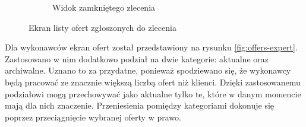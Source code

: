 \begin{figure}[ht!]
\begin{subfigure}[t]{0.32\textwidth}
    \centering
    \caption{Widok zamkniętego zlecenia}
  \end{subfigure}
  \caption{Ekran listy ofert zgłoszonych do zlecenia}
  \label{fig:offers-client}
\end{figure}

Dla wykonawców ekran ofert został przedstawiony na rysunku \ref{fig:offers-expert}. Zastosowano w nim dodatkowo podział na dwie kategorie: aktualne oraz archiwalne. Uznano to za przydatne, ponieważ spodziewano się, że wykonawcy będą pracować ze znacznie większą liczbą ofert niż klienci. Dzięki zastosowanemu podziałowi mogą przechowywać jako aktualne tylko te, które w danym momencie mają dla nich znaczenie. Przeniesienia pomiędzy kategoriami dokonuje się poprzez przeciągnięcie wybranej oferty w prawo. 


